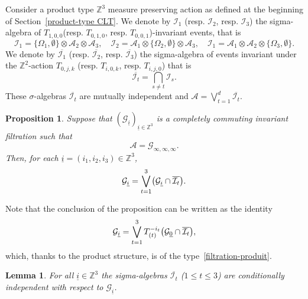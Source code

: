 \documentclass[10pt]{amsart}
\newtheorem{lemm}[theo]{Lemma}\newtheorem{prop}[theo]{Proposition}\newtheorem{coro}[theo]{Corollary}\newtheorem{conj}[theo]{Conjecture}
\theoremstyle{definition}\newtheorem{defi}[theo]{Definition}\newtheorem{rema}[theo]{Remark}\newtheorem{exam}[theo]{Example}\newtheorem{exem}[theo]{Example}\newtheorem{nota}[theo]{Notation}
\newcommand{\Z}{\mathbb{Z}}
\newcommand*\I{\mathcal{I}}
\newcommand*\A{\mathcal{A}}
\newcommand*\G{\mathcal{G}}
\let\originalleft\left
\let\originalright\right
\renewcommand{\left}{\mathopen{}\mathclose\bgroup\originalleft}
\renewcommand{\right}{\aftergroup\egroup\originalright}
\begin{document}
Consider a product type $\Z^3$ measure preserving action as defined at the beginning of Section~\ref{product-type CLT}. We denote by $\I_1$ (resp. $\I_2$, resp. $\I_3$) the sigma-algebra of $T_{1,0,0}$(resp. $T_{0,1,0}$, resp. $T_{0,0,1}$)-invariant events, that is
\[
\I_1=\{\Omega_1,\emptyset\}\otimes\A_2\otimes\A_{3},\quad \I_2=\A_1\otimes\{\Omega_2,\emptyset\}\otimes\A_{3},\quad \I_1=\A_1\otimes\A_2\otimes\{\Omega_3,\emptyset\}.
\]
We denote by $\overline{\I_1}$ (resp. $\overline{\I_2}$, resp. $\overline{\I_3}$) the sigma-algebra of events invariant under the $\Z^{2}$-action $T_{0,j,k}$ (resp. $T_{i,0,k}$, resp. $T_{i,j,0}$) that is
\[
\overline{\I_t}=\bigcap_{s\neq t}\I_s.
\]
These $\sigma$-algebras $\overline{\I_t}$ are mutually independent and $\A=\bigvee_{t=1}^d\overline{\I_t}$.

\begin{prop}\label{filt-prod}
Suppose that $(\G_{\underline{i}})_{\underline{i}\in\Z^3}$ is a completely commuting invariant filtration such that
\[
\A=\G_{\infty,\infty,\infty}.
\]
Then, for each $\underline{i}=(i_1,i_2,i_3)\in\Z^3$,
\[
\G_{\underline{i}}=\bigvee_{t=1}^3 \left(\G_{\underline{i}}\cap\overline{\I_t}\right).
\]
\end{prop}

Note that the conclusion of the proposition can be written as the identity
\[
\G_{\underline{i}}=\bigvee_{t=1}^3 T_{(t)}^{-i_t}\left(\G_{\underline0}\cap\overline{\I_t}\right),
\]
which, thanks to the product structure, is of the type~\eqref{filtration-produit}.

\begin{lemm} \label{cond-ind}
For all $\underline{i}\in\Z^3$ the sigma-algebras $\overline{\I_t}$ ($1\leq t\leq 3$) are conditionally independent with respect to $\G_{\underline{i}}$.
\end{lemm}
\end{document}
